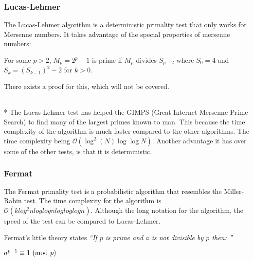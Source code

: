 \documentclass[main.tex]{subfiles}
\begin{document}
\subsubsection{Lucas-Lehmer}
The Lucas-Lehmer algorithm \cite{algh:lucas} is a deterministic primality test
that only works for Mersenne numbers. It takes advantage of the special
properties of mersenne numbers: \newline

\begin{mdframed}
  For some $p>2$, $M_p=2^p-1$ is prime if $M_p$ divides $S_{p-2}$ where $S_0=4$ and
  $S_k=(S_{k-1})^2-2$ for $k>0$.
\end{mdframed}

\begin{center}
  There exists a proof for this, which will not be covered.
\end{center}
\newline
\\*
The Lucas-Lehmer test has helped the GIMPS (Great Internet Mersenne Prime
Search) \cite{GIMPS} to find many of the largest primes known to man. This
because the time complexity of the algorithm is much faster compared to the
other algorithms. The time complexity being $\mathcal{O}(\log^{2}(N) \log \log N)$. Another advantage it has over some
of the other tests, is that it is deterministic.

\subsubsection{Fermat}
The Fermat primality test \cite{algh:fermat} is a probabilistic algorithm that
resembles the Miller-Rabin test. The time complexity for the algorithm is $\mathcal{O}(k
log^{2}n log log n log log log n)$. Although the long notation for the
algorithm, the speed of the test can be compared to Lucas-Lehmer.

Fermat's little theory \cite{fermat:little} states \textit{``If $p$ is prime and
  $a$ is not divisible by $p$ then: ''}

\begin{mdframed}
  \centering $a^{p - 1} \equiv 1 \ (\mathrm{mod}\ p)$
\end{mdframed}
\end{document}
